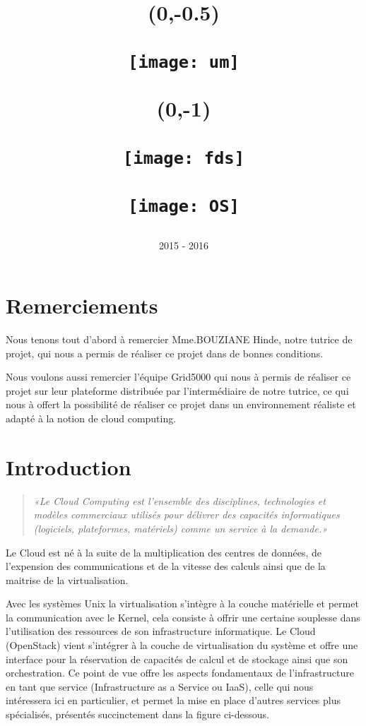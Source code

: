 \documentclass{report}
\title{
    \begin{textblock}{\textwidth}(0,-0.5)
        \begin{flushleft}
            \texttt{[image: um]}
        \end{flushleft}
    \end{textblock}
    \begin{textblock}{\textwidth}(0,-1)
        \begin{flushright}
            \texttt{[image: fds]}
        \end{flushright}
    \end{textblock}
    \vspace{3 cm}
    \begin{minipage}\linewidth
    \vspace{3 cm}
        \huge\centering{
            RAPPORT DE PROJET\break
            Prise en main d'un environnement de Cloud : OpenStack
        }
        \vspace{1 cm}\bigbreak
        \texttt{[image: OS]}
    \end{minipage}
}
\author{%
    \begin{minipage}\linewidth
        \centering{
            Groupe : \break
            BENAIS Charles,\break
            BRESSAND Jérémy,\break
            CULTY Alexandre,\break
            ROGLIANO Théo\bigbreak
            Tutrice : BOUZIANE Hinde
        }
    \end{minipage}
    \vspace{1 cm}
    \date{2015 - 2016}
}
\begin{document}

\maketitle %

\tableofcontents %

\large %


\newpage
\chapter*{Remerciements}
    Nous tenons tout d'abord à remercier Mme.BOUZIANE Hinde, notre tutrice de projet, qui nous a permis de réaliser ce projet dans de bonnes conditions.\bigbreak

    Nous voulons aussi remercier l'équipe Grid5000 qui nous à permis de réaliser ce projet sur leur plateforme distribuée par l'intermédiaire de notre tutrice, ce qui nous à offert la possibilité de réaliser ce projet dans un environnement réaliste et adapté à la notion de cloud computing.



\newpage
\chapter{Introduction}

    \begin{quote}
        \textit{«Le Cloud Computing est l'ensemble des disciplines, technologies et modèles commerciaux utilisés pour délivrer des capacités informatiques (logiciels, plateformes, matériels) comme un service à la demande.» \cite{cloud_computing}}
    \end{quote}
    \bigbreak

    Le Cloud est né à la suite de la multiplication des centres de données, de l'expension des communications et de la vitesse des calculs ainsi que de la maitrise de la virtualisation.

    \bigbreak

    Avec les systèmes Unix la virtualisation s'intègre à la couche matérielle et permet la communication avec le Kernel, cela consiste à offrir une certaine souplesse dans l'utilisation des ressources de son infrastructure informatique.\newline
    Le Cloud (OpenStack) vient s'intégrer à la couche de virtualisation du système et offre une interface pour la réservation de capacités de calcul et de stockage ainsi que son orchestration.\newline
    Ce point de vue offre les aspects fondamentaux de l'infrastructure en tant que service (Infrastructure as a Service ou IaaS), celle qui nous intéressera ici en particulier, et permet la mise en place d'autres services plus spécialisés, présentés succinctement dans la figure ci-dessous.
\end{document}
